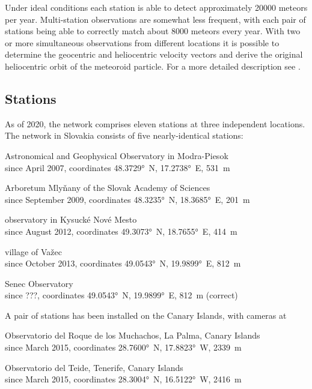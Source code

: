         Under ideal conditions each station is able to detect approximately 20000 meteors per year.
        Multi-station observations are somewhat less frequent, with each pair of stations being able
        to correctly match about 8000 meteors every year.
        With two or more simultaneous observations from different locations it is possible to determine
        the geocentric and heliocentric velocity vectors and derive the original heliocentric orbit of the meteoroid particle.
        For a more detailed description see \citet{fero?}.

    \subsection{Stations} \label{iAs}
        As of 2020, the network comprises eleven stations at three independent locations.
        The network in Slovakia consists of five nearly-identical stations:
        \begin{description}[leftmargin = 25mm]
            \item[AGO]      Astronomical and Geophysical Observatory in Modra-Piesok\\
                            since April 2007, coordinates \ang{48.3729}~N, \ang{17.2738}~E, \SI{531}{\metre}
            \item[ARBO]     Arboretum Mlyňany of the Slovak Academy of Sciences\\
                            since September 2009, coordinates \ang{48.3235}~N, \ang{18.3685}~E, \SI{201}{\metre}
            \item[KNM]      observatory in Kysucké Nové Mesto\\
                            since August 2012, coordinates \ang{49.3073}~N, \ang{18.7655}~E, \SI{414}{\metre}
            \item[VAZEC]    village of Važec\\
                            since October 2013, coordinates \ang{49.0543}~N, \ang{19.9899}~E, \SI{812}{\metre}
            \item[SENEC]    Senec Observatory\\
                            since ???, coordinates \ang{49.0543}~N, \ang{19.9899}~E, \SI{812}{\metre} (correct)
        \end{description}

        A pair of stations has been installed on the Canary Islands, with cameras at
        \begin{description}[leftmargin = 25mm]
            \item[LP]       Observatorio del Roque de los Muchachos, La Palma, Canary Islands\\
                            since March 2015, coordinates \ang{28.7600}~N, \ang{17.8823}~W, \SI{2339}{\metre}
            \item[TE]       Observatorio del Teide, Tenerife, Canary Islands\\
                            since March 2015, coordinates \ang{28.3004}~N, \ang{16.5122}~W, \SI{2416}{\metre}
        \end{description}

